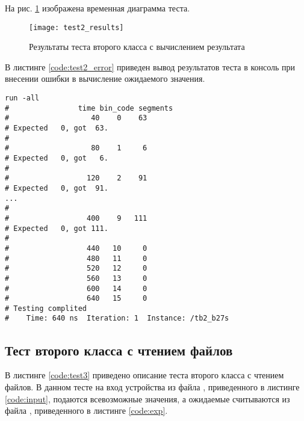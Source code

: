 На рис. \ref{fig:test2_results} изображена временная диаграмма теста.
\vspace{-0.5cm}
\begin{figure}[H]
	\begin{center}
		\texttt{[image: test2\_results]}
		\caption{Результаты теста второго класса с вычислением результата}
		\label{fig:test2_results}
	\end{center}
\end{figure}
\vspace{-1cm}

В листинге \ref{code:test2_error} приведен вывод результатов теста в консоль при внесении ошибки в вычисление ожидаемого значения.	
\begin{lstlisting}[caption=Результаты ошибочного теста второго класса с вычислением результата, label=code:test2_error, style=console]
run -all
# 		         time bin_code segments
#                   40    0    63
# Expected   0, got  63.
# 
#                   80    1     6
# Expected   0, got   6.
# 
#                  120    2    91
# Expected   0, got  91.
...
# 
#                  400    9   111
# Expected   0, got 111.
# 
#                  440   10     0
#                  480   11     0
#                  520   12     0
#                  560   13     0
#                  600   14     0
#                  640   15     0
# Testing complited
#    Time: 640 ns  Iteration: 1  Instance: /tb2_b27s
\end{lstlisting}
\vspace{-0.5cm}

\subsection{Тест второго класса с чтением файлов}

В листинге \ref{code:test3} приведено описание теста второго класса с чтением файлов. В данном тесте на вход устройства из файла , приведенного в листинге \ref{code:input}, подаются всевозможные значения, а ожидаемые считываются из файла , приведенного в листинге \ref{code:exp}. 

\begin{multicols}{2}
		
	
\end{multicols}

